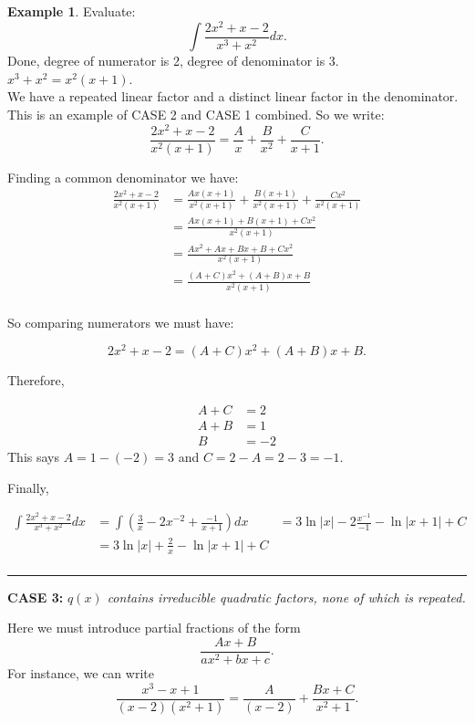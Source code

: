 \documentclass[reqno]{amsart}
\theoremstyle{definition}
\newtheorem{eg}[lem]{Example}
\numberwithin{equation}{section}
\begin{document}
\begin{eg} Evaluate:
\[ \int \frac{2x^2+x-2}{x^3+x^2} dx.\]
 Done, degree of numerator is 2, degree of denominator is 3.\\
 $x^3+x^2=x^2(x+1)$.\\
 We have a repeated linear factor and a distinct linear factor in the denominator.  This is an example of CASE 2 and CASE 1 combined.
So we write:
\[ \frac{2x^2+x-2}{x^2(x+1)} = \frac{A}{x}+\frac{B}{x^2}+\frac{C}{x+1}.\]

Finding a common denominator we have:
\begin{align*}
\frac{2x^2+x-2}{x^2(x+1)} &= \frac{Ax(x+1)}{x^2(x+1)}+\frac{B(x+1)}{x^2(x+1)}+\frac{Cx^2}{x^2(x+1)} \\
&= \frac{Ax(x+1)+B(x+1)+Cx^2}{x^2(x+1)}\\
&= \frac{Ax^2+Ax+Bx+B+Cx^2}{x^2(x+1)}\\
&= \frac{(A+C)x^2+(A+B)x+B}{x^2(x+1)}\\
\end{align*}

So comparing numerators we must have:

\[ 2x^2+x-2 = (A+C)x^2+(A+B)x+B.\]

Therefore,

\begin{align*}
A+C &= 2\\
A+B &= 1\\
B&=-2
\end{align*} 
This says $A=1-(-2)=3$ and $C=2-A=2-3=-1$.
\end{eg}
Finally,

\begin{align*} 
\int \frac{2x^2+x-2}{x^3+x^2} dx &= \int \left(\frac{3}{x}-2x^{-2}+\frac{-1}{x+1} \right) dx
&= 3\ln|x|-2\frac{x^{-1}}{-1}-\ln|x+1|+C\\
&= 3\ln|x|+\frac{2}{x}-\ln|x+1|+C\\
\end{align*}

\hrule
\vspace{1pc}

{\bf CASE 3:} {\it $q(x)$ contains irreducible quadratic factors, none of which is repeated.}

Here we must introduce partial fractions of the form
\[ \frac{Ax+B}{ax^2+bx+c}.\]
For instance, we can write
\[ \frac{x^3-x+1}{(x-2)(x^2+1)} = \frac{A}{(x-2)}+\frac{Bx+C}{x^2+1}.\]
\end{document}
